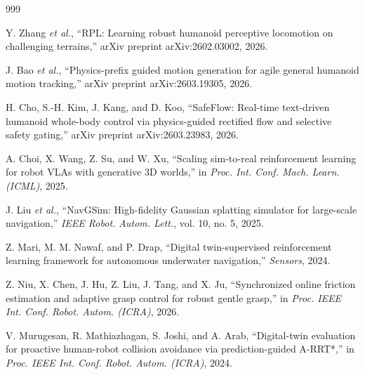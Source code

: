 \documentclass[12pt,a4paper,oneside]{report}
\begin{document}
\begin{thebibliography}{999}

Y. Zhang \textit{et al.}, ``{RPL}: Learning robust humanoid perceptive locomotion on challenging terrains,'' arXiv preprint arXiv:2602.03002, 2026.




J. Bao \textit{et al.}, ``Physics-prefix guided motion generation for agile general humanoid motion tracking,'' arXiv preprint arXiv:2603.19305, 2026.




H. Cho, S.-H. Kim, J. Kang, and D. Koo, ``{SafeFlow}: Real-time text-driven humanoid whole-body control via physics-guided rectified flow and selective safety gating,'' arXiv preprint arXiv:2603.23983, 2026.




A. Choi, X. Wang, Z. Su, and W. Xu, ``Scaling sim-to-real reinforcement learning for robot VLAs with generative 3D worlds,'' in \textit{Proc. Int. Conf. Mach. Learn. (ICML)}, 2025.




J. Liu \textit{et al.}, ``{NavGSim}: High-fidelity Gaussian splatting simulator for large-scale navigation,'' \textit{IEEE Robot. Autom. Lett.}, vol. 10, no. 5, 2025.




Z. Mari, M. M. Nawaf, and P. Drap, ``Digital twin-supervised reinforcement learning framework for autonomous underwater navigation,'' \textit{Sensors}, 2024.




Z. Niu, X. Chen, J. Hu, Z. Liu, J. Tang, and X. Ju, ``Synchronized online friction estimation and adaptive grasp control for robust gentle grasp,'' in \textit{Proc. IEEE Int. Conf. Robot. Autom. (ICRA)}, 2026.




V. Murugesan, R. Mathiazhagan, S. Joshi, and A. Arab, ``Digital-twin evaluation for proactive human-robot collision avoidance via prediction-guided A-RRT*,'' in \textit{Proc. IEEE Int. Conf. Robot. Autom. (ICRA)}, 2024.




\end{thebibliography}
\end{document}

